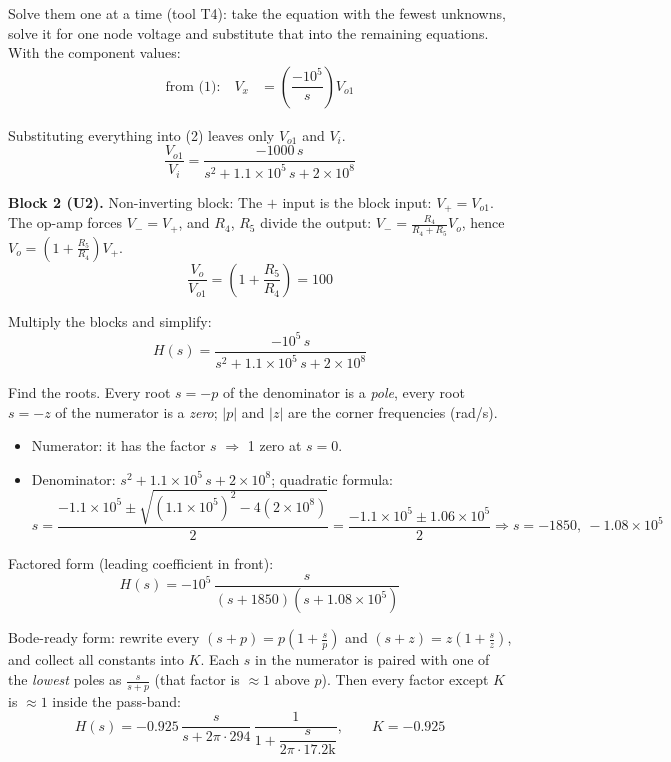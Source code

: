 \documentclass[11pt]{article}
\newcommand{\solstep}[2]{\par\medskip{\color{stepc}\textbf{Step #1 --- #2}}\par\nopagebreak}
\begin{document}
Solve them one at a time (tool T4): take the equation with the fewest unknowns, solve it for one node voltage and substitute that into the remaining equations. With the component values:
\begin{align*}
\text{from (1):}\quad V_{x} &= \left(\dfrac{-10^{5}}{s}\right)V_{o1}
\end{align*}

Substituting everything into (2) leaves only $V_{o1}$ and $V_i$.\[
\frac{V_{o1}}{V_i} = \dfrac{-1000\,s}{s^{2} + 1.1\times 10^{5}\,s + 2\times 10^{8}}
\]

\textbf{Block 2 (U2).} Non-inverting block: The $+$ input is the block input: $V_+ = V_{o1}$. The op-amp forces $V_-=V_+$, and $R_{4}$, $R_{5}$ divide the output: $V_- = \frac{R_{4}}{R_{4} + R_{5}}V_{o}$, hence $V_{o} = \left(1+\frac{R_{5}}{R_{4}}\right)V_+$.\[
\frac{V_{o}}{V_{o1}} = \left(1+\frac{R_{5}}{R_{4}}\right) = 100
\]

Multiply the blocks and simplify:\[
H(s) = \dfrac{-10^{5}\,s}{s^{2} + 1.1\times 10^{5}\,s + 2\times 10^{8}}
\]

\solstep{5}{Standard (Bode-ready) form}Find the roots. Every root $s=-p$ of the denominator is a \emph{pole}, every root $s=-z$ of the numerator is a \emph{zero}; $|p|$ and $|z|$ are the corner frequencies (rad/s).
\begin{itemize}[leftmargin=*,itemsep=2pt]
\item Numerator: it has the factor $s$ $\Rightarrow$ 1 zero at $s=0$.
\item Denominator: $s^{2} + 1.1\times 10^{5}\,s + 2\times 10^{8}$; quadratic formula:\[
s = \frac{-1.1\times 10^{5} \pm \sqrt{(1.1\times 10^{5})^2 - 4(2\times 10^{8})}}{2} = \frac{-1.1\times 10^{5} \pm 1.06\times 10^{5}}{2} \Rightarrow s = -1850,\ -1.08\times 10^{5}
\]

\end{itemize}

Factored form (leading coefficient in front):
\[
H(s) = -10^{5}\,\dfrac{s}{(s+1850)(s+1.08\times 10^{5})}
\]

Bode-ready form: rewrite every $(s+p) = p\left(1+\frac{s}{p}\right)$ and $(s+z) = z\left(1+\frac{s}{z}\right)$, and collect all constants into $K$. Each $s$ in the numerator is paired with one of the \emph{lowest} poles as $\frac{s}{s+p}$ (that factor is $\approx 1$ above $p$). Then every factor except $K$ is $\approx 1$ inside the pass-band:
\[
H(s) = -0.925\,\dfrac{s}{s+2\pi\cdot 294}\,\dfrac{1}{1+\dfrac{s}{2\pi\cdot 17.2\mathrm{k}}},\qquad K = -0.925
\]
\end{document}

